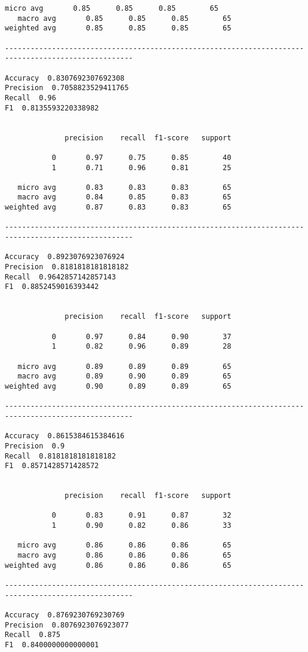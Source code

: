 \documentclass[11pt]{article}
\begin{document}
\begin{Verbatim}[commandchars=\\\{\}]
   micro avg       0.85      0.85      0.85        65
   macro avg       0.85      0.85      0.85        65
weighted avg       0.85      0.85      0.85        65

---------------------------------------------------------------------------------------------------- 

Accuracy  0.8307692307692308
Precision  0.7058823529411765
Recall  0.96
F1  0.8135593220338982


              precision    recall  f1-score   support

           0       0.97      0.75      0.85        40
           1       0.71      0.96      0.81        25

   micro avg       0.83      0.83      0.83        65
   macro avg       0.84      0.85      0.83        65
weighted avg       0.87      0.83      0.83        65

---------------------------------------------------------------------------------------------------- 

Accuracy  0.8923076923076924
Precision  0.8181818181818182
Recall  0.9642857142857143
F1  0.8852459016393442


              precision    recall  f1-score   support

           0       0.97      0.84      0.90        37
           1       0.82      0.96      0.89        28

   micro avg       0.89      0.89      0.89        65
   macro avg       0.89      0.90      0.89        65
weighted avg       0.90      0.89      0.89        65

---------------------------------------------------------------------------------------------------- 

Accuracy  0.8615384615384616
Precision  0.9
Recall  0.8181818181818182
F1  0.8571428571428572


              precision    recall  f1-score   support

           0       0.83      0.91      0.87        32
           1       0.90      0.82      0.86        33

   micro avg       0.86      0.86      0.86        65
   macro avg       0.86      0.86      0.86        65
weighted avg       0.86      0.86      0.86        65

---------------------------------------------------------------------------------------------------- 

Accuracy  0.8769230769230769
Precision  0.8076923076923077
Recall  0.875
F1  0.8400000000000001



\end{Verbatim}
\end{document}
